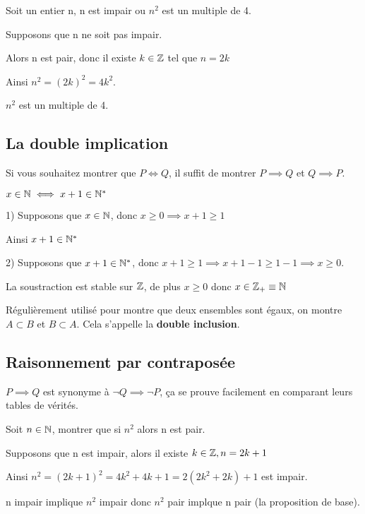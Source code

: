 \documentclass[a4paper, 12pt]{article}
\begin{document}
\begin{example}
    Soit un entier n, n est impair ou $n^2$ est un multiple de 4.

    \vspace{1em}

    Supposons que n ne soit pas impair.

    Alors n est pair, donc il existe $k \in \mathbb{Z}$ tel que $n = 2k$

    Ainsi $n^2 = (2k)^2 = 4k^2$.

    $n^2$ est un multiple de 4.
\end{example}

\subsection{La double implication}

Si vous souhaitez montrer que $P \iff Q$, il suffit de montrer $P \implies Q$ et $Q \implies P$.

\begin{example}
    $x \in \mathbb{N} \iff x + 1 \in \mathbb{N}^*$

    1) Supposons que $x \in \mathbb{N}$, donc $x \geq 0 \implies x + 1 \geq 1$

    Ainsi $x + 1 \in \mathbb{N}^*$

    2) Supposons que $x + 1 \in \mathbb{N}^*$, donc $x + 1 \geq 1 \implies x + 1 - 1 \geq 1 - 1 \implies x \geq 0$.

        La soustraction est stable sur $\mathbb{Z}$, de plus $x \geq 0$ donc $x \in \mathbb{Z}_+ \equiv \mathbb{N}$
\end{example}

\begin{remark}
    Régulièrement utilisé pour montre que deux ensembles sont égaux, on montre $A \subset B$ et $B \subset A$.
    Cela s'appelle la \textbf{double inclusion}.
\end{remark}

\subsection{Raisonnement par contraposée}

$P \implies Q$ est synonyme à $\neg Q \implies \neg P$, ça se prouve facilement en comparant leurs tables de vérités.

\begin{example}
    Soit $n \in \mathbb{N}$, montrer que si $n^2$ alors n est pair.

    \vspace{0.5em}

    Supposons que n est impair, alors il existe $k \in \mathbb{Z}, n = 2k + 1$

    Ainsi $n^2 = (2k + 1)^2 = 4k^2 + 4k + 1 = 2(2k^2 + 2k) + 1$ est impair.

    n impair implique $n^2$ impair donc $n^2$ pair implque n pair (la proposition de base).
\end{example}
\end{document}
